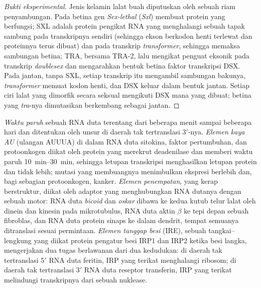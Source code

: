 \begin{proof}[Bukti eksperimental]
Jenis kelamin lalat buah diputuskan oleh sebuah riam penyambungan. Pada
betina gen \emph{Sex-lethal} (\emph{Sxl}) membuat protein yang berfungsi; SXL
adalah protein pengikat RNA yang menghalangi sebuah tapak sambung pada
transkripnya sendiri (sehingga ekson berkodon henti terlewat dan proteinnya
terus dibuat) dan pada transkrip \emph{transformer}, sehingga memaksa sambungan
betina; TRA, bersama TRA-2, lalu mengikat penguat eksonik pada transkrip
\emph{doublesex} dan mengarahkan bentuk betina faktor transkripsi DSX. Pada
jantan, tanpa SXL, setiap transkrip itu mengambil sambungan bakunya,
\emph{transformer} memuat kodon henti, dan DSX keluar dalam bentuk jantan.
Setiap ciri lalat yang dimorfik secara seksual mengikuti DSX mana yang
dibuat; betina yang \emph{tra}-nya dimutasikan berkembang sebagai jantan.
\end{proof}

\begin{definition}\label{def:b3:rna-regulation:stability}
%
\emph{Waktu paruh} sebuah RNA duta terentang dari beberapa menit sampai
beberapa hari dan ditentukan oleh unsur di daerah tak tertranslasi 3$'$-nya.
\emph{Elemen kaya AU} (ulangan AUUUA) di dalam RNA duta sitokina, faktor
pertumbuhan, dan protoonkogen diikat oleh protein yang merekrut deadenilase
dan memberi waktu paruh \qtyrange{10}{30}{min}, sehingga letupan transkripsi
menghasilkan letupan protein dan tidak lebih; mutasi yang membuangnya
menimbulkan ekspresi berlebih dan, bagi sebagian protoonkogen, kanker.
\emph{Elemen penempatan}, yang kerap berstruktur, diikat oleh adaptor yang
menghubungkan RNA dutanya dengan sebuah motor: RNA duta \emph{bicoid} dan
\emph{oskar} dibawa ke kedua kutub telur lalat oleh dinein dan kinesin pada
mikrotubulus, RNA duta aktin $\beta$ ke tepi depan sebuah fibroblas, dan RNA
duta protein sinaps ke dalam dendrit, tempat semuanya ditranslasi sesuai
permintaan. \emph{Elemen tanggap besi} (IRE), sebuah tangkai--lengkung yang
diikat protein pengatur besi IRP1 dan IRP2 ketika besi langka, mengerjakan dua
tugas berlawanan dari dua kedudukan: di daerah tak tertranslasi 5$'$ RNA duta
feritin, IRP yang terikat menghalangi ribosom; di daerah tak tertranslasi 3$'$
RNA duta reseptor transferin, IRP yang terikat melindungi transkripnya dari
sebuah nuklease.
\end{definition}

